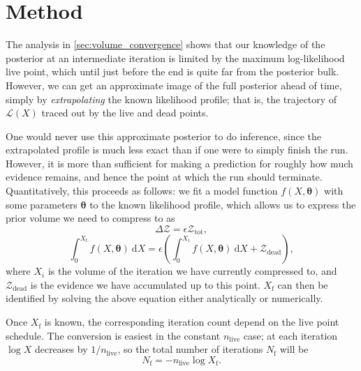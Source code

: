 \documentclass[usenatbib]{mnras}
\newcommand{\thetab}{\bm{\theta}}
\newcommand{\nlive}{n_\mathrm{live}}
\begin{document}
\section{Method}\label{sec:method}
The analysis in \cref{sec:volume_convergence} shows that our knowledge of the posterior at an intermediate iteration is limited by the maximum log-likelihood live point, which until just before the end is quite far from the posterior bulk. However, we can get an approximate image of the full posterior ahead of time, simply by \textit{extrapolating} the known likelihood profile; that is, the trajectory of $\mathcal{L}(X)$ traced out by the live and dead points.
\par
One would never use this approximate posterior to do inference, since the extrapolated profile is much less exact than if one were to simply finish the run. However, it is more than sufficient for making a prediction for roughly how much evidence remains, and hence the point at which the run should terminate. Quantitatively, this proceeds as follows: we fit a model function $f(X, \thetab)$ with some parameters $\thetab$ to the known likelihood profile, which allows us to express the prior volume we need to compress to as
\begin{equation}
	\Delta \mathcal{Z} = \epsilon \mathcal{Z}_\mathrm{tot},
\end{equation}
\begin{equation}\label{model endpoint}
	\int_0^{X_\mathrm{f}} f(X, \thetab)\ \mathrm{d}X = \epsilon \left( \int_0^{X_i} f(X, \thetab)\ \mathrm{d}X + \mathcal{Z}_\mathrm{dead} \right),
\end{equation}
where $X_i$ is the volume of the iteration we have currently compressed to, and $\mathcal{Z}_\mathrm{dead}$ is the evidence we have accumulated up to this point. $X_\mathrm{f}$ can then be identified by solving the above equation either analytically or numerically. 
\par
Once $X_\mathrm{f}$ is known, the corresponding iteration count depend on the live point schedule. The conversion is easiest in the constant $\nlive$ case; at each iteration $\log X$ decreases by $1/\nlive$, so the total number of iterations $N_\mathrm{f}$ will be
\begin{equation}
	N_\mathrm{f} = - \nlive \log X_\mathrm{f} .
\end{equation}
\end{document}
